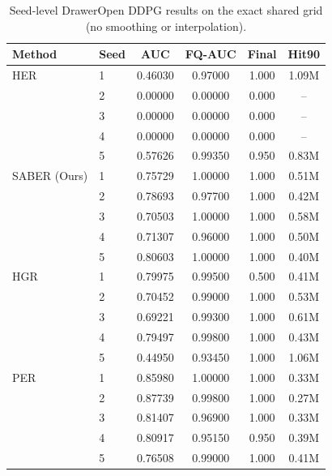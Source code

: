 \begin{table}[t]
\centering
\small
\setlength{\tabcolsep}{1pt}
\begin{tabular}{llcccc}
\toprule
Method & Seed & AUC & FQ-AUC & Final & Hit90 \\
\midrule
HER & 1 & 0.46030 & 0.97000 & 1.000 & 1.09M \\
 & 2 & 0.00000 & 0.00000 & 0.000 & -- \\
 & 3 & 0.00000 & 0.00000 & 0.000 & -- \\
 & 4 & 0.00000 & 0.00000 & 0.000 & -- \\
 & 5 & 0.57626 & 0.99350 & 0.950 & 0.83M \\
\addlinespace[1pt]
SABER (Ours) & 1 & 0.75729 & 1.00000 & 1.000 & 0.51M \\
 & 2 & 0.78693 & 0.97700 & 1.000 & 0.42M \\
 & 3 & 0.70503 & 1.00000 & 1.000 & 0.58M \\
 & 4 & 0.71307 & 0.96000 & 1.000 & 0.50M \\
 & 5 & 0.80603 & 1.00000 & 1.000 & 0.40M \\
\addlinespace[1pt]
HGR & 1 & 0.79975 & 0.99500 & 0.500 & 0.41M \\
 & 2 & 0.70452 & 0.99000 & 1.000 & 0.53M \\
 & 3 & 0.69221 & 0.99300 & 1.000 & 0.61M \\
 & 4 & 0.79497 & 0.99800 & 1.000 & 0.43M \\
 & 5 & 0.44950 & 0.93450 & 1.000 & 1.06M \\
\addlinespace[1pt]
PER & 1 & 0.85980 & 1.00000 & 1.000 & 0.33M \\
 & 2 & 0.87739 & 0.99800 & 1.000 & 0.27M \\
 & 3 & 0.81407 & 0.96900 & 1.000 & 0.33M \\
 & 4 & 0.80917 & 0.95150 & 0.950 & 0.39M \\
 & 5 & 0.76508 & 0.99000 & 1.000 & 0.41M \\
\bottomrule
\end{tabular}
\caption{Seed-level DrawerOpen DDPG results on the exact shared grid (no smoothing or interpolation).}
\label{tab:supp-seeds-drawer-open-ddpg}
\end{table}
